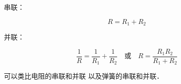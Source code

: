 

串联：

\begin{equation}
R = R_1 + R_2
\end{equation}

并联：

\begin{equation}
\frac{1}{R} = \frac{1}{R_1} + \frac{1}{R_2}
\quad \text{或} \quad
R = \frac{R_1R_2}{R_1 + R_2}
\end{equation}

可以类比电阻的串联和并联 以及弹簧的串联和并联．
